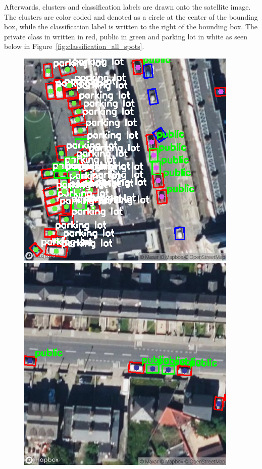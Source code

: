 Afterwards, clusters and classification labels are drawn onto the satellite image. The clusters are color coded and denoted as a circle at the center of the bounding box, while the classification label is written to the right of the bounding box. The private class in written in red, public in green and parking lot in white as seen below in Figure~\ref{fig:classification_all_spots}.

\begin{figure}[htbp]
    \centering
    \begin{minipage}{0.45\textwidth}
        \centering
        \includegraphics[width=\textwidth]{images/classification1.png}
    \end{minipage}
    \hfill
    \begin{minipage}{0.45\textwidth}
        \centering
        \includegraphics[width=\textwidth]{images/classification2.png}

\end{minipage}
\end{figure}
